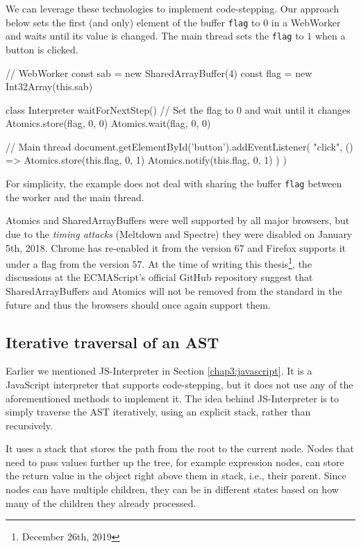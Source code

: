 We can leverage these technologies to implement code-stepping. Our approach below sets the first (and only) element of the buffer \texttt{flag} to $0$ in a WebWorker
and waits until its value is changed. The main thread sets the \texttt{flag} to $1$ when a button is clicked.
\begin{code}
// WebWorker
const sab = new SharedArrayBuffer(4)
const flag = new Int32Array(this.sab)

class Interpreter {
    waitForNextStep() {
        // Set the flag to 0 and wait until it changes
        Atomics.store(flag, 0, 0)
        Atomics.wait(flag, 0, 0)
    }
}

// Main thread
document.getElementById('button').addEventListener(
    "click",
    () => {
        Atomics.store(this.flag, 0, 1)
        Atomics.notify(this.flag, 0, 1)
    })
)
\end{code}
For simplicity, the example does not deal with sharing the buffer \texttt{flag} between the worker and the main thread.

Atomics and SharedArrayBuffers were well supported by all major browsers, but due to the \emph{timing attacks} (Meltdown and Spectre) they were disabled on
January 5th, 2018. Chrome has re-enabled it from the version $67$ and Firefox supports it under a flag from the version $57$. At the time of
writing this thesis\footnote{December 26th, 2019}, the discussions at the ECMAScript's official GitHub repository suggest that SharedArrayBuffers and Atomics
will not be removed from the standard in the future and thus the browsers should once again support them.

\subsection*{Iterative traversal of an AST}
Earlier we mentioned JS-Interpreter \cite{JSInterpreter} in Section \ref{chap3:javascript}. It is a JavaScript interpreter that supports code-stepping, but
it does not use any of the aforementioned methods to implement it. The idea behind JS-Interpreter is to simply traverse the AST iteratively, using an explicit
stack, rather than recursively.

It uses a stack that stores the path from the root to the current node. Nodes that need to pass values further up the tree, for example expression nodes, can store
the return value in the object right above them in stack, i.e., their parent. Since nodes can have multiple children, they can be in different states
based on how many of the children they already processed.

